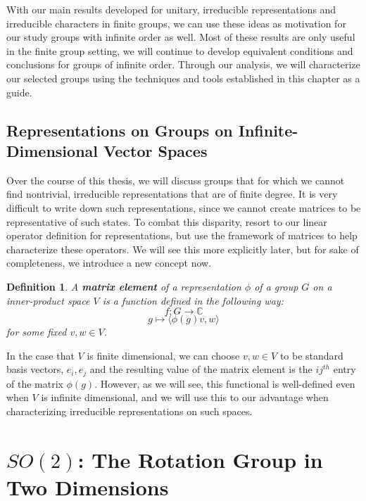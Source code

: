 \documentclass[10pt]{ucthesis}
\newcommand{\C}{\mathbb{C}}
\newtheorem{definition}{Definition}[chapter]
\begin{document}
With our main results developed for unitary, irreducible representations and irreducible characters in finite groups, we can use these ideas as motivation for our study groups with infinite order as well. Most of these results are only useful in the finite group setting, we will continue to develop equivalent conditions and conclusions for groups of infinite order. Through our analysis, we will characterize our selected groups using the techniques and tools established in this chapter as a guide.

\section{Representations on Groups on Infinite-Dimensional Vector Spaces}

Over the course of this thesis, we will discuss groups that for which we cannot find nontrivial, irreducible representations that are of finite degree. It is very difficult to write down such representations, since we cannot create matrices to be representative of such states. To combat this disparity, resort to our linear operator definition for representations, but use the framework of matrices to help characterize these operators. We will see this more explicitly later, but for sake of completeness, we introduce a new concept now.

\begin{definition}
	A \textbf{matrix element} of a representation $\phi$ of a group $G$ on a inner-product space $V$ is a function defined in the following way:
$$f:G\rightarrow\C$$
$$g\mapsto\langle\phi(g)v,w\rangle$$
for some fixed $v,w\in V$.
\end{definition}

In the case that $V$ is finite dimensional, we can choose $v,w\in V$ to be standard basis vectors, $e_i,e_j$ and the resulting value of the matrix element is the $ij^{th}$ entry of the matrix $\phi(g)$. However, as we will see, this functional is well-defined even when $V$ is infinite dimensional, and we will use this to our advantage when characterizing irreducible representations on such spaces.

\chapter{$SO(2)$: The Rotation Group in Two Dimensions}
\end{document}

